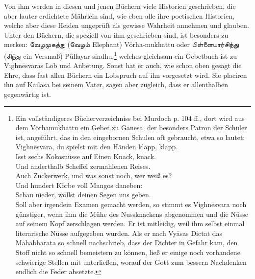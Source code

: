 \documentclass{article}
\newcommand{\TamilText}[1]{\texttamil{#1}}
\newcommand{\tam}[1]{\TamilText{#1}}
\begin{document}
Von ihm werden in diesen und jenen Büchern viele Historien geschrieben, die aber lauter erdichtete Mährlein sind, wie eben alle ihre poetischen Historien, welche aber diese Heiden ungeprüft als gewisse Wahrheit annehmen und glauben. Unter den Büchern, die speziell von ihm geschrieben sind, ist besonders zu merken: \tam{வேழமுகத்து} (\tam{வேழம்} Elephant) Vörha-mukhattu oder \tam{பிள்ளையார்சிந்து} (\tam{சிந்து} ein Versmaß) Püllayar-sindhu,\footnote{Ein vollständigeres Bücherverzeichniss bei Murdoch p. 104 ff., dort wird aus dem Vörhamukhattu ein Gebet zu Gan\={e}sa, der besonders Patron der Schüler ist, angeführt, das in den eingebornen Schulen oft gebraucht, etwa so lautet:\\\hspace*{5mm}Vighn\={e}svara, du spielst mit den Händen klapp, klapp.\\\hspace*{5mm}Isst sechs Kokosnüsse auf Einen Knack, knack.\\\hspace*{5mm}Und anderthalb Scheffel zermahlenen Reises.\\\hspace*{5mm}Auch Zuckerwerk, und was sonst noch, wer weiß es?\\\hspace*{5mm}Und hundert Körbe voll Mangos daneben:\\\hspace*{5mm}Schau nieder, wollst deinen Segen uns geben.\\\hspace*{5mm}Soll aber irgendein Examen gemacht werden, so stimmt es Vighn\={e}svara noch günstiger, wenn ihm die Mühe des Nussknackens abgenommen und die Nüsse auf seinem Kopf zerschlagen werden. Er ist mitleidig, weil ihm selbst einmal literarische Nüsse aufgegeben wurden. Als er nach Vy\={a}sas Dictat das Mah\={a}bh\={a}rata so schnell nachschrieb, dass der Dichter in Gefahr kam, den Stoff nicht so schnell bemeistern zu können, ließ er einige noch vorhandene schwierige Stellen mit unterließen, worauf der Gott zum bessern Nachdenken endlich die Feder absetzte.} welches gleichsam ein Gebetbuch ist zu Vighn\={e}svaras Lob und Anbetung. Sonst hat er auch, wie schon oben gesagt die Ehre, dass fast allen Büchern ein Lobspruch auf ihn vorgesetzt wird. Sie placiren ihn auf Kail\={a}sa bei seinem Vater, sagen aber zugleich, dass er allenthalben gegenwärtig ist.
\end{document}
